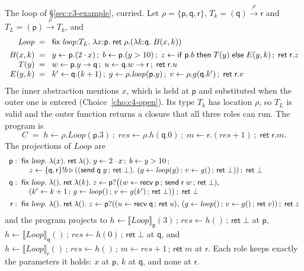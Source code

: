 \documentclass[11pt]{report}
\theoremstyle{plain}
\theoremstyle{definition}
\theoremstyle{remark}
\newcommand{\kw}[1]{\mathsf{#1}}
\newcommand{\pp}{\mathsf{p}}
\newcommand{\qq}{\mathsf{q}}
\newcommand{\rr}{\mathsf{r}}
\newcommand{\bind}[3]{#1 \leftarrow #2\,;\;#3}
\newcommand{\cret}[1]{\kw{ret}\;#1}
\newcommand{\com}[3]{#1.#2 \to #3}
\newcommand{\cif}[4]{\kw{if}\;#1.#2\;\kw{then}\;#3\;\kw{else}\;#4}
\newcommand{\nsend}[2]{\kw{send}\;#1\;#2}
\newcommand{\nrecv}[1]{\kw{recv}\;#1}
\newcommand{\sendbr}[4]{#1!#2 \mathbin{\triangleright} (#3,\,#4)}
\newcommand{\recvbr}[3]{#1?(#2,\,#3)}
\newcommand{\proj}[2]{\llbracket #1 \rrbracket_{#2}}
\newcommand{\farr}[3]{(#1) \xrightarrow{#2} #3}
\newcommand{\clam}[3]{\lambda #1{:}#2.\;#3}
\newcommand{\cfix}[3]{\kw{fix}\;#1{:}#2.\;#3}
\newcommand{\nlam}[2]{\lambda(#1).\;#2}
\newcommand{\nfix}[2]{\kw{fix}\;#1.\;#2}
\begin{document}
The loop of \S\ref{sec:c3-example}, curried.  Let $\rho=\{\pp,\qq,\rr\}$,
$T_k=\farr{\qq}{\rho}{\rr}$ and $T_L=\farr{\pp}{\rho}{T_k}$, and
\[
\begin{array}{r@{\;\;}l}
  \mathit{Loop} \;=\; & \cfix{\mathit{loop}}{T_L}{\clam{x}{\pp}{\cret{\rho.(\clam{k}{\qq}{B(x,k)})}}}\\[1ex]
  B(x,k) \;=\; & \bind{y}{\pp.(2\cdot x)}{\bind{b}{\pp.(y>10)}{\bind{z}{\cif{\pp}{b}{T(y)}{E(y,k)}}{\cret{\rr.z}}}}\\
  T(y) \;=\; & \bind{w}{\com{\pp}{y}{\qq}}{\bind{u}{\com{\qq}{w}{\rr}}{\cret{\rr.u}}}\\
  E(y,k) \;=\; & \bind{k'}{\qq.(k+1)}{\bind{g}{\rho.\mathit{loop}(\pp.y)}{\bind{v}{\rho.g(\qq.k')}{\cret{\rr.v}}}}
\end{array}
\]
The inner abstraction mentions $x$, which is held at $\pp$ and substituted
when the outer one is entered (Choice~\ref{cho:c4-open}).  Its type $T_k$
has location $\rho$, so $T_L$ is valid and the outer function returns a
closure that all three roles can run.  The program is
\[
  C \;=\; \bind{h}{\rho.\mathit{Loop}(\pp.3)}{\bind{\mathit{res}}{\rho.h(\qq.0)}{\bind{m}{\rr.(\mathit{res}+1)}{\cret{\rr.m}}}}.
\]
The projections of $\mathit{Loop}$ are
\[
\begin{array}{r@{\;\;}l}
  \pp: & \nfix{\mathit{loop}}{\nlam{x}{\kw{ret}\;\nlam{}{y\leftarrow 2\cdot x\,;\;b\leftarrow y>10\,;}}}\\
       & \quad z\leftarrow\sendbr{\{\qq,\rr\}}{b}{(\nsend{\qq}{y}\,;\,\kw{ret}\;\bot)}{(g\leftarrow\mathit{loop}(y)\,;\,v\leftarrow g()\,;\,\kw{ret}\;\bot)}\,;\;\kw{ret}\;\bot\\[1ex]
  \qq: & \nfix{\mathit{loop}}{\nlam{}{\kw{ret}\;\nlam{k}{z\leftarrow\pp?\big((w\leftarrow\nrecv{\pp}\,;\,\nsend{\rr}{w}\,;\,\kw{ret}\;\bot),}}}\\
       & \quad (k'\leftarrow k+1\,;\,g\leftarrow\mathit{loop}()\,;\,v\leftarrow g(k')\,;\,\kw{ret}\;\bot)\big)\,;\;\kw{ret}\;\bot\\[1ex]
  \rr: & \nfix{\mathit{loop}}{\nlam{}{\kw{ret}\;\nlam{}{z\leftarrow\recvbr{\pp}{(u\leftarrow\nrecv{\qq}\,;\,\kw{ret}\;u)}{(g\leftarrow\mathit{loop}()\,;\,v\leftarrow g()\,;\,\kw{ret}\;v)}\,;\;\kw{ret}\;z}}}
\end{array}
\]
and the program projects to
$h\leftarrow\proj{\mathit{Loop}}{\pp}(3)\,;\,\mathit{res}\leftarrow h()\,;\,\kw{ret}\;\bot$
at $\pp$,
$h\leftarrow\proj{\mathit{Loop}}{\qq}()\,;\,\mathit{res}\leftarrow h(0)\,;\,\kw{ret}\;\bot$
at $\qq$, and
$h\leftarrow\proj{\mathit{Loop}}{\rr}()\,;\,\mathit{res}\leftarrow h()\,;\,m\leftarrow\mathit{res}+1\,;\,\kw{ret}\;m$
at $\rr$.  Each role keeps exactly the parameters it holds: $x$ at $\pp$,
$k$ at $\qq$, and none at $\rr$.
\end{document}
